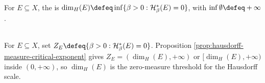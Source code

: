 \begin{definition} \label{def:hausdorff-dimension} \\
For $E\subseteq X$, the  is $\dim_H(E)\defeq\inf\{\beta>0:\mathcal{H}_\beta^\ast(E)=0\}$, with $\inf\emptyset\defeq+\infty$.
\end{definition}

\begin{remark} \label{rem:hausdorff-dimension-threshold} \\
For $E\subseteq X$, set $Z_E\defeq\{\beta>0:\mathcal{H}_\beta^\ast(E)=0\}$. Proposition \ref{prop:hausdorff-measure-critical-exponent} gives $Z_E=(\dim_H(E),+\infty)$ or $[\dim_H(E),+\infty)$ inside $(0,+\infty)$, so $\dim_H(E)$ is the zero-measure threshold for the Hausdorff scale.
\end{remark}
